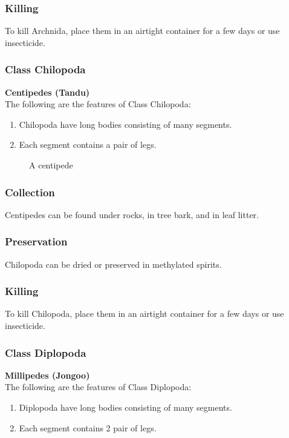 \subsubsection{Killing}
To kill Archnida, place them in an airtight container for a few days or use insecticide.
		
\subsubsection{Class Chilopoda}
\textbf{Centipedes (Tandu)}\\
The following are the features of Class Chilopoda:
\begin{enumerate}
\item{Chilopoda have long bodies consisting of many segments.}
\item{Each segment contains a pair of legs.}
\end{enumerate}

\begin{figure}[h]
\begin{center}
\def\svgwidth{8cm}

\caption{A centipede}
\label{fig:centipede}
\end{center}
\end{figure}

\subsubsection{Collection}
Centipedes can be found under rocks, in tree bark, and in leaf litter.

\subsubsection{Preservation} 
Chilopoda can be dried or preserved in methylated spirits.

\subsubsection{Killing}
To kill Chilopoda, place them in an airtight container for a few days or use insecticide.

\subsubsection{Class Diplopoda}
\textbf{Millipedes (Jongoo)}\\
The following are the features of Class Diplopoda:
\begin{enumerate}
\item{Diplopoda have long bodies consisting of many segments.}
\item{Each segment contains 2 pair of legs.}
\end{enumerate}

